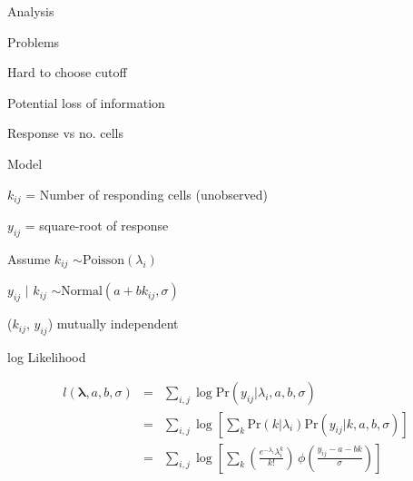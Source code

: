 \documentclass[aspectratio=169,12pt,t]{beamer}
\begin{document}
\begin{frame}[c]{Analysis}
\end{frame}



\begin{frame}{Problems}
  \bbi
\item Hard to choose cutoff
\item Potential loss of information
  \ei
\end{frame}


\begin{frame}{Response vs no. cells}
\end{frame}


\begin{frame}[c]{Model}

  \vspace{3mm}

  $k_{ij}$ = Number of responding cells (unobserved)

  $y_{ij}$ = square-root of response

  \vspace{10mm}

  Assume {\hilit $k_{ij}$ $\sim \text{Poisson}(\lambda_i)$}

  \vspace{2mm}

  \hspace*{15mm} {\hilit $y_{ij}$ $|$ $k_{ij}$ $\sim \text{Normal}(a +
    b k_{ij}, \sigma)$}

  \vspace{2mm}

  \hspace*{15mm} {\hilit ($k_{ij}$, $y_{ij}$) mutually independent}

  \vspace{5mm}


\end{frame}




\begin{frame}[c]{log Likelihood}


  \begin{eqnarray*}
    l(\boldsymbol{\lambda}, a, b, \sigma)
       & = & \sum_{i,j} \log \text{Pr}(y_{ij} | \lambda_i, a, b, \sigma) \\
    & = & \sum_{i,j} \log \left[ \sum_k
      \text{Pr}(k | \lambda_i)
      \text{Pr}(y_{ij} | k, a, b, \sigma)
      \right] \\
    & = & \sum_{i,j} \log \left[ \sum_k
      \left(\frac{e^{-\lambda_i} \lambda_i^k}{ k! }\right) \, \phi\left( \frac{y_{ij} - a -
        bk}{\sigma} \right)
      \right]
  \end{eqnarray*}

\end{frame}
\end{document}
